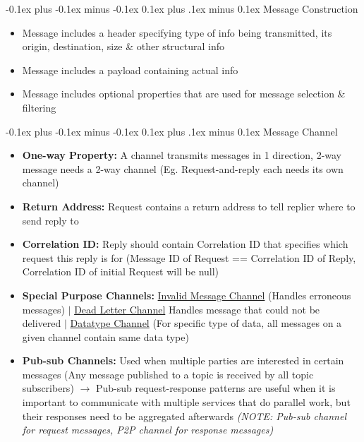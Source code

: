 \documentclass[landscape]{article}
\makeatletter
\renewcommand{\subsection}{\@startsection{subsection}{2}{0mm}%
  {-0.1ex plus -0.1ex minus -0.1ex}%
  {0.1ex plus .1ex minus 0.1ex}%
{\normalfont\scriptsize\bfseries}}
\makeatother
\begin{document}
\begin{multicols*}{5}
    \subsection{Message Construction}
    \begin{itemize}
      \item Message includes a header specifying type of info being transmitted, its origin, destination, size \& other structural info
      \item Message includes a payload containing actual info
      \item Message includes optional properties that are used for message selection \& filtering
    \end{itemize}

    \subsection{Message Channel}
    \begin{itemize}
      \item \textbf{One-way Property:} A channel transmits messages in 1 direction, 2-way message needs a 2-way channel (Eg. Request-and-reply each needs its own channel)
      \item \textbf{Return Address:} Request contains a return address to tell replier where to send reply to
      \item \textbf{Correlation ID:} Reply should contain Correlation ID that specifies which request this reply is for (Message ID of Request == Correlation ID of Reply, Correlation ID of initial Request will be null)
      \item \textbf{Special Purpose Channels:} \underline{Invalid Message Channel} (Handles erroneous messages) $|$ \underline{Dead Letter Channel} Handles message that could not be delivered $|$ \underline{Datatype Channel} (For specific type of data, all messages on a given channel contain same data type) 
      \item \textbf{Pub-sub Channels:} Used when multiple parties are interested in certain messages (Any message published to a topic is received by all topic subscribers) $\rightarrow$ Pub-sub request-response patterns are useful when it is important to communicate with multiple services that do parallel work, but their responses need to be aggregated afterwards \textit{(NOTE: Pub-sub channel for request messages, P2P channel for response messages)}
    \end{itemize}


\end{multicols*}
\end{document}
